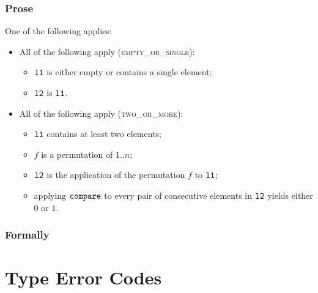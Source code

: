 \subsection{Prose}
One of the following applies:
\begin{itemize}
  \item All of the following apply (\textsc{empty\_or\_single}):
  \begin{itemize}
    \item $\texttt{l1}$ is either empty or contains a single element;
    \item $\texttt{l2}$ is $\texttt{l1}$.
  \end{itemize}

  \item All of the following apply (\textsc{two\_or\_more}):
  \begin{itemize}
    \item $\texttt{l1}$ contains at least two elements;
    \item $f$ is a permutation of $1..n$;
    \item $\texttt{l2}$ is the application of the permutation $f$ to $\texttt{l1}$;
    \item applying $\texttt{compare}$ to every pair of consecutive elements in $\texttt{l2}$ yields either $0$ or $1$.
  \end{itemize}
\end{itemize}

\subsection{Formally}

\chapter{Type Error Codes}

